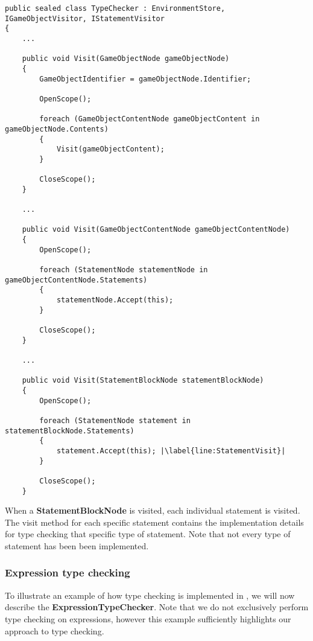 \begin{lstlisting}[language=CSharp, caption={Applying Scope to GameObjects, GameObjectContents and StatementBlocks}, label={lst:ApplyScope},escapechar=|]
public sealed class TypeChecker : EnvironmentStore, IGameObjectVisitor, IStatementVisitor
{
    ...

    public void Visit(GameObjectNode gameObjectNode)
    {
        GameObjectIdentifier = gameObjectNode.Identifier;

        OpenScope();

        foreach (GameObjectContentNode gameObjectContent in gameObjectNode.Contents) 
        {
            Visit(gameObjectContent);
        }

        CloseScope();
    }

    ...

    public void Visit(GameObjectContentNode gameObjectContentNode)
    {
        OpenScope();

        foreach (StatementNode statementNode in gameObjectContentNode.Statements)
        {
            statementNode.Accept(this);
        }

        CloseScope();
    }

    ... 

    public void Visit(StatementBlockNode statementBlockNode)
    {
        OpenScope();

        foreach (StatementNode statement in statementBlockNode.Statements) 
        {
            statement.Accept(this); |\label{line:StatementVisit}|
        }
        
        CloseScope();
    }
\end{lstlisting}

When a \textbf{StatementBlockNode} is visited, each individual statement is visited. The visit method for each specific statement contains the implementation details for type checking that specific type of statement. Note that not every type of statement has been been implemented.

\subsubsection*{Expression type checking} \label{sec:ExpressionTypeChecking}
To illustrate an example of how type checking is implemented in \dazel{}, we will now describe the \textbf{ExpressionTypeChecker}.
Note that we do not exclusively perform type checking on expressions, however this example sufficiently highlights our approach to type checking.



